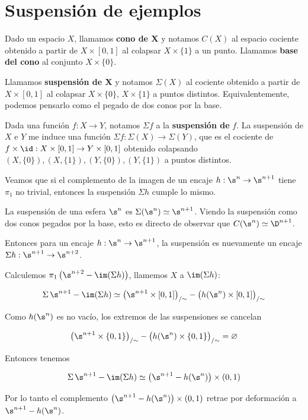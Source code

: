 \section{Suspensión de ejemplos}

Dado un espacio $X$, llamamos \textbf{cono de X} y notamos $C(X)$ al espacio cociente obtenido a partir de $X\times[0,1]$ al colapsar $X\times\{1\}$ a un punto. Llamamos \textbf{base del cono} al conjunto $X\times\{0\}$.

Llamamos \textbf{suspensión de X} y notamos $\Sigma(X)$ al cociente obtenido a partir de $X\times [0,1]$ al colapsar $X\times\{0\}$, $X\times\{1\}$ a puntos distintos. Equivalentemente, podemos pensarlo como el pegado de dos conos por la base.

Dada una función $f:X\to Y$, notamos $\Sigma f$ a la \textbf{suspensión de} $f$. La suspensión de $X$ e $Y$ me induce una función $\Sigma f:\Sigma(X)\to\Sigma(Y)$, que es el cociente de $f\times\id:X\times[0,1]\to Y\times[0,1]$ obtenido colapsando $(X,\{0\}),(X,\{1\}),(Y,\{0\}),(Y,\{1\})$ a puntos distintos.

Veamos que si el complemento de la imagen de un encaje $h:\s^n\to\s^{n+1}$ tiene $\pi_1$ no trivial, entonces la suspensión $\Sigma h$ cumple lo mismo.

\begin{obs}
La suspensión de una esfera $\s^n$ es $\Sigma(\s^n)\simeq\s^{n+1}$. Viendo la suspensión como dos conos pegados por la base, esto es directo de observar que $C(\s^n)\simeq \D^{n+1}$.
\end{obs}


Entonces para un encaje $h:\s^n\to\s^{n+1}$, la suspensión es nuevamente un encaje $\Sigma h:\s^{n+1}\to\s^{n+2}$. 

Calculemos $\pi_1\left(\s^{n+2}-\im(\Sigma h)\right)$, llamemos $X$ a $\im(\Sigma h)$:

$$\Sigma\,\s^{n+1} - \im(\Sigma h)\simeq \big(\s^{n+1}\times[0,1]\big)_{/\sim} - \big(h(\s^n)\times [0,1]\big)_{/\sim}$$

Como $h(\s^n)$ es no vacío, los extremos de las suspensiones se cancelan

$$\big(\s^{n+1}\times\{0,1\}\big)_{/\sim} - \big(h(\s^n)\times\{0,1\}\big)_{/\sim}=\varnothing$$

Entonces tenemos 

$$\Sigma\,\s^{n+1} - \im(\Sigma h)\simeq \big(\s^{n+1}-h(\s^n)\big)\times (0,1)$$

Por lo tanto el complemento $\big(\s^{n+1}-h(\s^n)\big)\times (0,1)$ retrae por deformación a $\s^{n+1}-h(\s^n)$.

